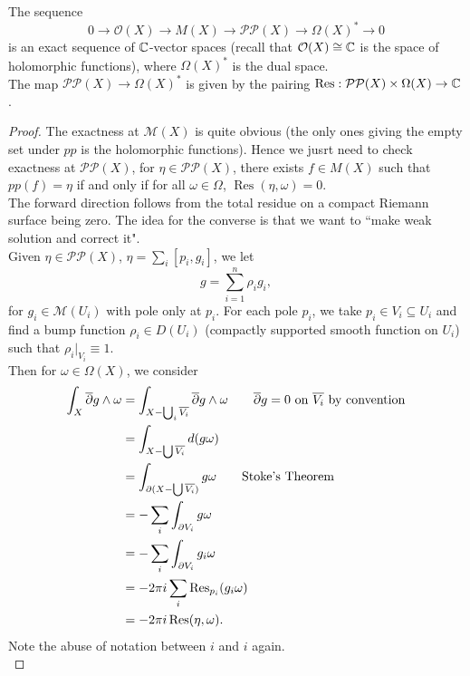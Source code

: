 \documentclass{article}
\begin{document}
{\begin{theorem}
    The sequence 
    \[0 \to \mathcal{O}(X) \to M(X) \to \mathcal{P} \mathcal{P}(X) \to \Omega(X)^* \to 0\]
    is an exact sequence of $\mathbb{C}$-vector spaces (recall that $\mathcal{O}(X) \cong \mathbb{C}$ is the space of holomorphic functions), where $\Omega(X)^*$ is the dual space.\\

    The map $\mathcal{P} \mathcal{P}(X) \to \Omega(X)^*$ is given by the pairing $\operatorname{Res}: \mathcal{P} \mathcal{P}(X) \times \Omega(X) \to \mathbb{C}$.
\end{theorem}


\begin{proof}
    The exactness at $\mathcal{M}(X)$ is quite obvious (the only ones giving the empty set under $pp$ is the holomorphic functions). Hence we jusrt need to check exactness at $\mathcal{P} \mathcal{P}(X)$, for $\eta \in \mathcal{P} \mathcal{P}(X)$, there exists $f \in M(X)$ such that $pp(f) = \eta$ if and only if for all $\omega \in \Omega$, $\operatorname{Res}(\eta, \omega) = 0$.\\

   The forward direction follows from the total residue on a compact Riemann surface being zero. The idea for the converse is that we want to ``make weak solution and correct it".\\

    Given $\eta \in \mathcal{P} \mathcal{P}(X)$, $\eta = \sum_i [p_i, g_i]$, we let $$ g = \sum_{i = 1}^n \rho_i g_i, $$
    for $g_i \in \mathcal{M}(U_i)$ with pole only at $p_i$. For each pole $p_i$, we take $p_i \in V_i \subseteq U_i$ and find a bump function $\rho_i \in D(U_i)$ (compactly supported smooth function on $U_i$) such that $\rho_i|_{V_i} \equiv 1$.\\

    Then for $\omega \in \Omega(X)$, we consider
    \begin{align*}
        \int_X \overline{\partial} g \wedge \omega &= \int_{X - \bigcup_i \overline{V_i}} \overline{\partial} g \wedge \omega \tag*{$\overline{\partial} g = 0$ on $\overline{V_i}$ by convention}\\
        &= \int_{X - \bigcup \overline{V_i}} d(g \omega)\\
        &= \int_{\partial(X - \bigcup \overline{V_i})} g \omega \tag*{Stoke's Theorem}\\
        &= - \sum_i \int_{\partial V_i} g \omega\\
        &= - \sum_i \int_{\partial V_i} g_i \omega\\
        &= - 2\pi i \sum_{i} \operatorname{Res}_{p_i}(g_i \omega)\\
        &= -2\pi i \operatorname{Res}(\eta, \omega).
    \end{align*}
    Note the abuse of notation between $i$ and $i$ again.\\


\end{proof}}
\end{document}
